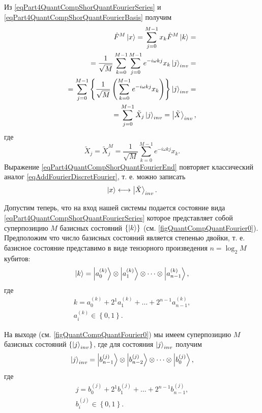 Из \eqref{eqPart4QuantCompShorQuantFourierSeries} и
\eqref{eqPart4QuantCompShorQuantFourierBasis} получим
\begin{eqnarray}
\hat{F}^{M}\ket{x} = \sum_{j = 0}^{M - 1}x_k \hat{F}^{M}
\ket{k} = 
\nonumber \\
= \frac{1}{\sqrt{M}}\sum_{k = 0}^{M -1}\sum_{j = 0}^{M - 1}
e^{-i \omega k j}x_k\ket{j}_{inv} = 
\nonumber \\
= \sum_{j = 0}^{M - 1} \left\{\frac{1}{\sqrt{M}}\left(
\sum_{k = 0}^{M - 1}e^{-i \omega k j} x_k
\right)\right\}\ket{j}_{inv} = 
\nonumber \\
= \sum_{j = 0}^{M - 1}\tilde{X}_j\ket{j}_{inv} = \left|\tilde{X}\right>_{inv},
\nonumber
\end{eqnarray}
где 
\begin{equation}
\tilde{X}_j = \tilde{X}_j^{M} = 
\frac{1}{\sqrt{M}}\sum_{k = 0}^{M - 1}e^{-i \omega k j} x_k.
\label{eqPart4QuantCompShorQuantFourierEnd}
\end{equation}
Выражение \eqref{eqPart4QuantCompShorQuantFourierEnd} повторяет
классический аналог \eqref{eqAddFourierDiscretFourier}, т. е. можно записать
\[
 \ket{x} \longleftrightarrow \left|\tilde{X}\right>_{inv}.
\]



Допустим теперь, что на вход нашей системы подается состояние вида
\eqref{eqPart4QuantCompShorQuantFourierSeries} которое представляет
собой суперпозицию $M$ базисных состояний
$\left\{\ket{k}\right\}$ 
(см. \autoref{figQuantCompQuantFourier0}). 
Предположим что число базисных
состояний является степенью двойки, т. е. базисное состояние
представимо в виде тензорного произведения $n = \log_2{M}$ кубитов:
\begin{equation}
\ket{k} = \ket{a^{(k)}_0} \otimes  \ket{a^{(k)}_1}
\otimes \cdots \otimes \ket{a^{(k)}_{n-1}}, 
\nonumber
\end{equation}
где
\begin{eqnarray}
k = a^{(k)}_0 + 2^1 a^{(k)}_1 + \dots + 2^{n-1} a^{(k)}_{n-1},
\nonumber \\
a^{(k)}_i \in \left\{0, 1\right\}.
\nonumber
\end{eqnarray}

На выходе
(см. \autoref{figQuantCompQuantFourier0})
мы имеем суперпозицию $M$ базисных состояний
$\left\{\ket{j}_{inv}\right\}$, где для состояния
$\ket{j}_{inv}$ получим 
\begin{equation}
\ket{j}_{inv} = \ket{b^{(j)}_{n-1}} \otimes
\ket{b^{(j)}_{n-2}} 
\otimes \cdots \otimes \ket{b^{(j)}_{0}}, 
\nonumber
\end{equation}
где
\begin{eqnarray}
j = b^{(j)}_0 + 2^1 b^{(j)}_1 + \dots + 2^{n-1} b^{(j)}_{n-1},
\nonumber \\
b^{(j)}_i \in \left\{0, 1\right\}.
\nonumber
\end{eqnarray}

